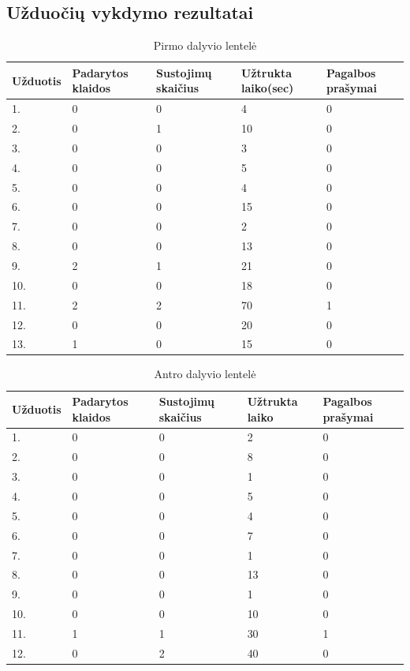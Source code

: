 \documentclass[oneside]{VUMIFPSkursinis}
\begin{document}
\subsection{Užduočių vykdymo rezultatai}
\begin{center}
	\begin{table}[!pht]
	\caption{Pirmo dalyvio lentelė}
	\begin{tabular}{ |p{1.8cm} | p{3.4cm} | p{3.4cm} | p{2.5cm} | p{3.5cm}|}
	\hline
	Užduotis&Padarytos klaidos&Sustojimų skaičius&Užtrukta laiko(sec)&Pagalbos prašymai\\ \hline
1.&0&0&4&0 \\ \hline
2.&0&1&10&0 \\ \hline
3.&0&0&3&0 \\ \hline
4.&0&0&5&0 \\ \hline
5.&0&0&4&0 \\ \hline
6.&0&0&15&0 \\ \hline
7.&0&0&2&0 \\ \hline
8.&0&0&13&0 \\ \hline
9.&2&1&21&0 \\ \hline
10.&0&0&18&0 \\ \hline
11.&2&2&70&1 \\ \hline
12.&0&0&20&0 \\ \hline
13.&1&0&15&0 \\ \hline
\end{tabular}
\end{table}
\vspace{0.7cm}
	\begin{table}[!pht]
	\caption{Antro dalyvio lentelė}
	\begin{tabular}{ |p{1.8cm} | p{3.4cm} | p{3.4cm} | p{2.5cm} | p{3.5cm}|}
	\hline
	Užduotis&Padarytos klaidos&Sustojimų skaičius&Užtrukta laiko&Pagalbos prašymai\\ \hline
1.& 0 & 0 &2&0 \\ \hline
2.&0&0&8&0 \\ \hline
3.&0&0&1&0 \\ \hline
4.&0&0&5&0 \\ \hline
5.&0&0&4&0 \\ \hline
6.&0&0&7&0 \\ \hline
7.&0&0&1&0 \\ \hline
8.&0&0&13&0 \\ \hline
9.&0&0&1&0 \\ \hline
10.&0&0&10&0 \\ \hline
11.&1&1&30&1 \\ \hline
12.&0&2&40&0 \\ \hline

\end{tabular}
\end{table}
\end{center}
\end{document}

